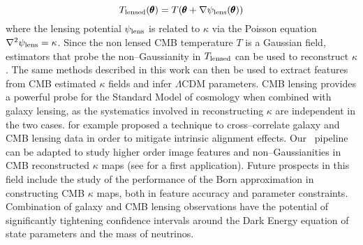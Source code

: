 \begin{equation}
\label{eq:8:tlens}
T_{\rm lensed}(\pmb{\theta}) = T(\pmb{\theta} + \nabla \psi_{\rm lens}(\pmb{\theta}))
\end{equation} 
%
where the lensing potential $\psi_{\rm lens}$ is related to $\kappa$ via the Poisson equation $\nabla^2\psi_{\rm lens}=\kappa$. Since the non lensed CMB temperature $T$ is a Gaussian field, estimators that probe the non--Gaussianity in $T_{\rm lensed}$ can be used to reconstruct $\kappa$ \citep{CMBLens}. The same methods described in this work can then be used to extract features from CMB estimated $\kappa$ fields and infer $\Lambda$CDM parameters. CMB lensing provides a powerful probe for the Standard Model of cosmology when combined with galaxy lensing, as the systematics involved in reconstructing $\kappa$ are independent in the two cases. \citep{CMBIA} for example proposed a technique to cross--correlate galaxy and CMB lensing data in order to mitigate intrinsic alignment effects. Our \LT\, pipeline can be adapted to study higher order image features and non--Gaussianities in CMB reconstructed $\kappa$ maps (see \citep{PetriCMB} for a first application). Future prospects in this field include the study of the performance of the Born approximation in constructing CMB $\kappa$ maps, both in feature accuracy \citep{CMBCalabrese,CMBPrattenLewis} and parameter constraints. Combination of galaxy and CMB lensing observations have the potential of significantly tightening confidence intervals around the Dark Energy equation of state parameters and the mass of neutrinos.   


